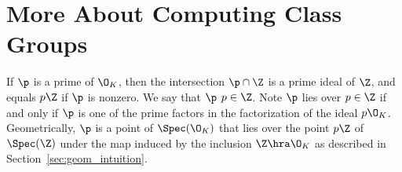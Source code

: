 


\section{More About Computing Class Groups}\label{sec:comcg}
If $\p$ is a prime of $\O_K$, then the intersection $\p\cap \Z$ is
a prime ideal of $\Z$, and equals $p\Z$ if $\p$ is nonzero.  
We say that $\p$  $p\in\Z$. Note $\p$ lies over 
$p\in\Z$ if and only if $\p$ is one of the prime factors in the 
factorization of the ideal $p\O_K$.  Geometrically, $\p$ is a point 
of $\Spec(\O_K)$ that lies over the point $p\Z$ of $\Spec(\Z)$ under 
the map induced by the inclusion $\Z\hra \O_K$ as described in 
Section~\ref{sec:geom_intuition}.


